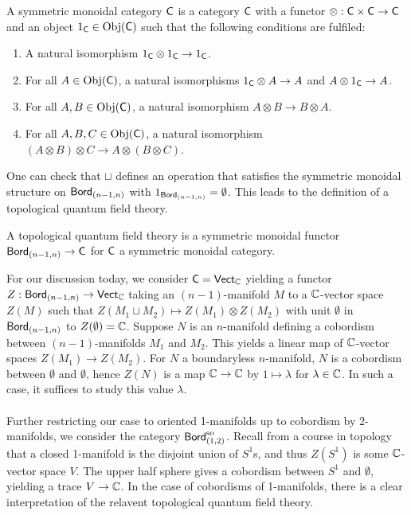\begin{definition}\label{def: symmetric monoidal category}
    A symmetric monoidal category $\mathsf{C}$ is a category $\mathsf{C}$ with a functor $\otimes:\mathsf{C}\times\mathsf{C}\to\mathsf{C}$ and an object $1_{\mathsf{C}}\in\mathrm{Obj}(\mathsf{C})$ such that the following conditions are fulfiled: 
    \begin{enumerate}[label=(\alph*)]
        \item A natural isomorphism $1_{\mathsf{C}}\otimes 1_{\mathsf{C}}\to 1_{\mathsf{C}}$. 
        \item For all $A\in\mathrm{Obj}(\mathsf{C})$, a natural isomorphisms $1_{\mathsf{C}}\otimes A\to A$ and $A\otimes 1_{\mathsf{C}}\to A$.
        \item For all $A,B\in\mathrm{Obj}(\mathsf{C})$, a natural isomorphism $A\otimes B\to B\otimes A$. 
        \item For all $A,B,C\in\mathrm{Obj}(\mathsf{C})$, a natural isomorphism $(A\otimes B)\otimes C\to A\otimes(B\otimes C)$. 
    \end{enumerate}
\end{definition}
One can check that $\sqcup$ defines an operation that satisfies the symmetric monoidal structure on $\mathsf{Bord}_{(n-1,n)}$ with $1_{\mathsf{Bord}_{(n-1,n)}}=\emptyset$. This leads to the definition of a topological quantum field theory. 
\begin{definition}
    A topological quantum field theory is a symmetric monoidal functor $\mathsf{Bord}_{(n-1,n)}\to\mathsf{C}$ for $\mathsf{C}$ a symmetric monoidal category. 
\end{definition}
For our discussion today, we consider $\mathsf{C}=\mathsf{Vect}_{\mathbb{C}}$ yielding a functor $Z:\mathsf{Bord}_{(n-1,n)}\to\mathsf{Vect}_{\mathbb{C}}$ taking an $(n-1)$-manifold $M$ to a $\mathbb{C}$-vector space $Z(M)$ such that $Z(M_{1}\sqcup M_{2})\mapsto Z(M_{1})\otimes Z(M_{2})$ with unit $\emptyset$ in $\mathsf{Bord}_{(n-1,n)}$ to $Z(\emptyset)=\mathbb{C}$. Suppose $N$ is an $n$-manifold defining a cobordism between $(n-1)$-manifolds $M_{1}$ and $M_{2}$. This yields a linear map of $\mathbb{C}$-vector spaces $Z(M_{1})\to Z(M_{2})$. For $N$ a boundaryless $n$-manifold, $N$ is a cobordism between $\emptyset$ and $\emptyset$, hence $Z(N)$ is a map $\mathbb{C}\to \mathbb{C}$ by $1\mapsto\lambda$ for $\lambda\in\mathbb{C}$. In such a case, it suffices to study this value $\lambda$. 
\\\\
Further restricting our case to oriented 1-manifolds up to cobordism by 2-manifolds, we consider the category $\mathsf{Bord}_{(1,2)}^{\mathrm{so}}$. Recall from a course in topology that a closed 1-manifold is the disjoint union of $S^{1}$s, and thus $Z(S^{1})$ is some $\mathbb{C}$-vector space $V$. The upper half sphere gives a cobordism between $S^{1}$ and $\emptyset$, yielding a trace $V\to\mathbb{C}$. In the case of cobordisms of 1-manifolds, there is a clear interpretation of the relavent topological quantum field theory. 
